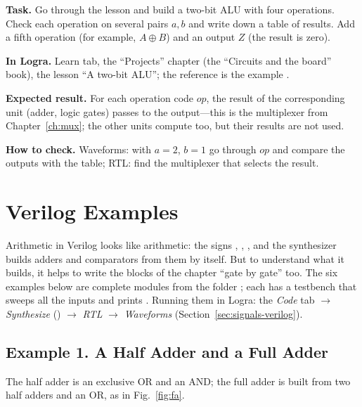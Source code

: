 \begin{diybox}
\textbf{Task.}  Go through the lesson and build a two-bit ALU with four
operations.  Check each operation on several pairs $a,b$ and write down
a table of results.  Add a fifth operation (for example, $A\oplus B$)
and an output $Z$ (the result is zero).

\textbf{In Logra.} Learn tab, the ``Projects'' chapter (the ``Circuits and the
board'' book), the lesson ``A two-bit ALU''; the reference is the example
.

\textbf{Expected result.} For each operation code $op$, the result of the
corresponding unit (adder, logic gates) passes to the output---this is the
multiplexer from Chapter~\ref{ch:mux}; the other units compute too, but their
results are not used.

\textbf{How to check.} Waveforms: with $a=2$, $b=1$ go through $op$ and compare
the outputs with the table; RTL: find the multiplexer that selects the result.
\end{diybox}

\section{Verilog Examples}
\label{sec:arith-verilog}

Arithmetic in Verilog looks like arithmetic: the signs \code{+}, \code{-},
\code{>}, and the synthesizer builds adders and comparators from them by
itself. But to understand what it builds, it helps to write the blocks of the
chapter ``gate by gate'' too. The six examples below are complete modules from
the folder ; each has a testbench  that
sweeps all the inputs and prints . Running them in Logra: the
\emph{Code} tab $\to$ \emph{Synthesize} () $\to$ \emph{RTL}
$\to$ \emph{Waveforms} (Section~\ref{sec:signals-verilog}).

\subsection{Example 1. A Half Adder and a Full Adder}

The half adder is an exclusive OR and an AND; the full adder is built from two
half adders and an OR, as in Fig.~\ref{fig:fa}.


